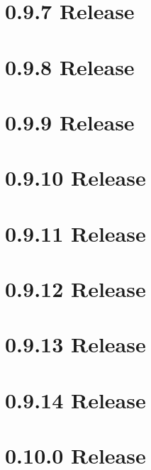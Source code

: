 \let\mypdfximage\pdfximage\def\pdfximage{\immediate\mypdfximage}\documentclass[twoside]{book}
\newcommand{\+}{\discretionary{\mbox{\scriptsize$\hookleftarrow$}}{}{}}
\begin{document}
\chapter{0.9.7 Release}
\label{doc_news_2021-07-09_0_9_7_md}

\chapter{0.9.8 Release}
\label{doc_news_2021-10-04_0_9_8_md}

\chapter{0.9.9 Release}
\label{doc_news_2022-03-10_0_9_9_md}

\chapter{0.9.10 Release}
\label{doc_news_2022-07-11_0_9_10_md}

\chapter{0.9.11 Release}
\label{doc_news_2022-10-05_0_9_11_md}

\chapter{0.9.12 Release}
\label{doc_news_2023-03-03_0_9_12_md}

\chapter{0.9.13 Release}
\label{doc_news_2023-03-14_0_9_13_md}

\chapter{0.9.14 Release}
\label{doc_news_2023-03-16_0_9_14_md}

\chapter{0.10.0 Release}
\label{doc_news_2023-05-23_0_10_0_md}

\end{document}
